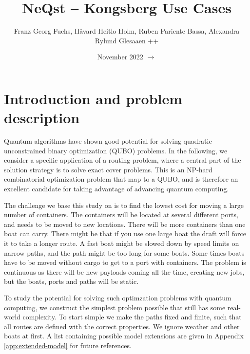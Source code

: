 \documentclass{article}
\title{NeQst -- Kongsberg Use Cases}
\author{Franz Georg Fuchs, Håvard Heitlo Holm, Ruben Pariente Bassa, Alexandra Rylund Glesaaen ++}
\date{November 2022 $\rightarrow$}
\begin{document}
\maketitle



\section{Introduction and problem description}
\label{sec:intro}

Quantum algorithms have shown good potential for solving quadratic unconstrained binary optimization (QUBO) problems. 
In the following, we consider a specific application of a routing problem, where a central part of the solution strategy is to solve exact cover problems. 
This is an NP-hard combinatorial optimization problem that map to a QUBO, and is therefore an excellent candidate for taking advantage of advancing quantum computing.
 
The challenge we base this study on is to find the lowest cost for moving a
large number of containers. The containers will be located at several different
ports, and needs to be moved to new locations. There will be more containers
than one boat can carry. There might be that if you use one large boat the draft
will force it to take a longer route. A fast boat might be slowed down by speed
limits on narrow paths, and the path might be too long for some boats. Some
times boats have to be moved without cargo to get to a port with containers.
The problem is continuous as there will be new payloads coming all the time,
creating new jobs, but the boats, ports and paths will be static. 






To study the potential for solving such optimzation problems with quantum computing, we construct the simplest problem possible that still has some real-world complexity. To start simple we make the paths fixed and finite, such that all routes are
defined with the correct properties. We ignore weather and other boats at first.
A list containing possible model extensions are given in Appendix \ref{app:extended-model} for future references.
\end{document}
